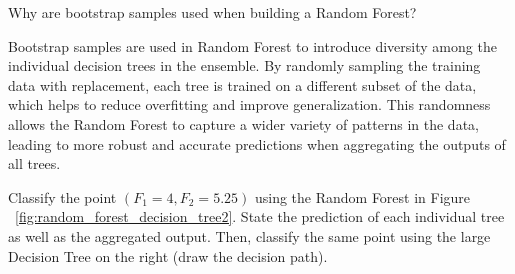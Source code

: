 \documentclass[12pt]{article}
\begin{document}
    \begin{ejercicio}
        Why are bootstrap samples used when building a Random Forest?

        Bootstrap samples are used in Random Forest to introduce diversity among the individual decision trees in the ensemble. By randomly sampling the training data with replacement, each tree is trained on a different subset of the data, which helps to reduce overfitting and improve generalization. This randomness allows the Random Forest to capture a wider variety of patterns in the data, leading to more robust and accurate predictions when aggregating the outputs of all trees.
    \end{ejercicio}

    \begin{ejercicio}
        Classify the point $(F_1 = 4, F_2 = 5.25)$ using the Random Forest in Figure ~\ref{fig:random_forest_decision_tree2}. State the prediction of each individual tree as well as the aggregated output. Then, classify the same point using the large Decision Tree on the right (draw the decision path).

        \begin{figure}[h!]
        \centering
\end{figure}
\end{ejercicio}
\end{document}
